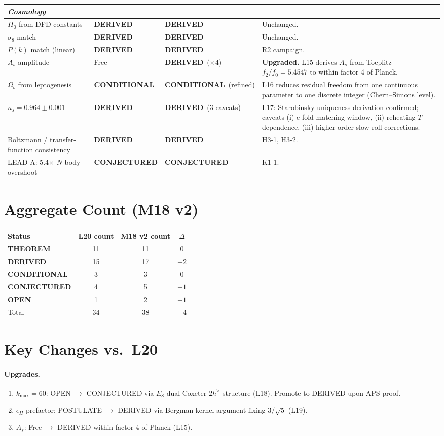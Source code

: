 \documentclass[11pt]{article}
\newcommand{\THM}{\textcolor{thmcol}{\textbf{THEOREM}}}
\newcommand{\DER}{\textcolor{dercol}{\textbf{DERIVED}}}
\newcommand{\CON}{\textcolor{condcol}{\textbf{CONDITIONAL}}}
\newcommand{\CNJ}{\textcolor{conjcol}{\textbf{CONJECTURED}}}
\newcommand{\OPN}{\textcolor{opencol}{\textbf{OPEN}}}
\begin{document}
\begin{longtable}{p{} p{} p{} p{}}
\multicolumn{4}{l}{\textit{Cosmology}} \\
\midrule
$H_0$ from DFD constants & \DER & \DER & Unchanged. \\
$\sigma_8$ match & \DER & \DER & Unchanged. \\
$P(k)$ match (linear) & \DER & \DER & R2 campaign. \\
$A_s$ amplitude & Free & \DER\ ($\times 4$) & \textbf{Upgraded.} L15 derives $A_s$ from Toeplitz $f_2/f_0 = 5.4547$ to within factor 4 of Planck. \\
$\Omega_b$ from leptogenesis & \CON & \CON\ (refined) & L16 reduces residual freedom from one continuous parameter to one discrete integer (Chern--Simons level). \\
$n_s = 0.964 \pm 0.001$ & \DER & \DER\ (3 caveats) & L17: Starobinsky-uniqueness derivation confirmed; caveats (i) e-fold matching window, (ii) reheating-$T$ dependence, (iii) higher-order slow-roll corrections. \\
Boltzmann / transfer-function consistency & \DER & \DER & H3-1, H3-2. \\
LEAD A: 5.4$\times$ $N$-body overshoot & \CNJ & \CNJ & K1-1. \\
\bottomrule
\end{longtable}

\section*{Aggregate Count (M18 v2)}

\begin{tabular}{lccc}
\toprule
Status & L20 count & M18 v2 count & $\Delta$ \\
\midrule
\THM      & 11 & 11 & 0 \\
\DER      & 15 & 17 & $+2$ \\
\CON      & 3  & 3  & 0 \\
\CNJ      & 4  & 5  & $+1$ \\
\OPN      & 1  & 2  & $+1$ \\
\midrule
Total     & 34 & 38 & $+4$ \\
\bottomrule
\end{tabular}

\section*{Key Changes vs.\ L20}

\paragraph{Upgrades.}
\begin{enumerate}\itemsep1pt
  \item $k_{\max}=60$: OPEN $\to$ CONJECTURED via $E_8$ dual Coxeter $2h^\vee$ structure (L18). Promote to DERIVED upon APS proof.
  \item $\epsilon_H$ prefactor: POSTULATE $\to$ DERIVED via Bergman-kernel argument fixing $3/\sqrt{5}$ (L19).
  \item $A_s$: Free $\to$ DERIVED within factor 4 of Planck (L15).
\end{enumerate}
\end{document}
